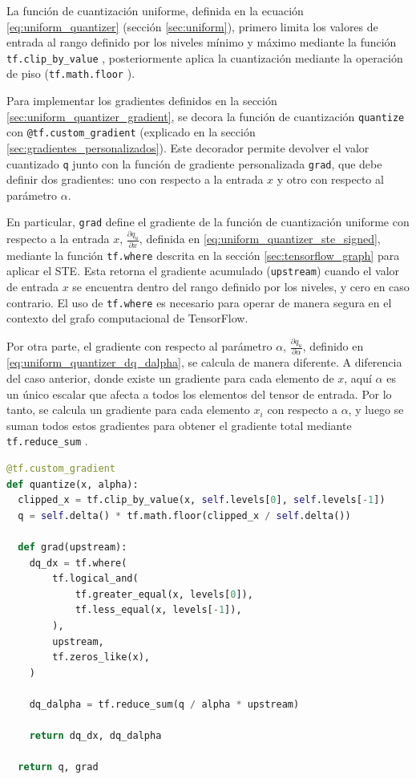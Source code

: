 La función de cuantización uniforme, definida en la ecuación \eqref{eq:uniform_quantizer} (sección \ref{sec:uniform}), primero limita los valores de entrada al rango definido por los niveles mínimo y máximo mediante la función \texttt{tf.clip\_by\_value} \cite{tensorflow_clip_by_value}, posteriormente aplica la cuantización mediante la operación de piso (\texttt{tf.math.floor} \cite{tensorflow_math_floor}).

Para implementar los gradientes definidos en la sección \ref{sec:uniform_quantizer_gradient}, se decora la función de cuantización \texttt{quantize} con \texttt{@tf.custom\_gradient} (explicado en la sección \ref{sec:gradientes_personalizados}). Este decorador permite devolver el valor cuantizado \texttt{q} junto con la función de gradiente personalizada \texttt{grad}, que debe definir dos gradientes: uno con respecto a la entrada $x$ y otro con respecto al parámetro $\alpha$.

En particular, \texttt{grad} define el gradiente de la función de cuantización uniforme con respecto a la entrada $x$, $\frac{\partial q_{u}}{\partial x}$, definida en \eqref{eq:uniform_quantizer_ste_signed}, mediante la función \texttt{tf.where} \cite{tensorflow_where} descrita en la sección \ref{sec:tensorflow_graph} para aplicar el STE. Esta retorna el gradiente acumulado (\texttt{upstream}) cuando el valor de entrada $x$ se encuentra dentro del rango definido por los niveles, y cero en caso contrario. El uso de \texttt{tf.where} es necesario para operar de manera segura en el contexto del grafo computacional de TensorFlow.

Por otra parte, el gradiente con respecto al parámetro $\alpha$, $\frac{\partial q_{u}}{\partial \alpha}$, definido en \eqref{eq:uniform_quantizer_dq_dalpha}, se calcula de manera diferente. A diferencia del caso anterior, donde existe un gradiente para cada elemento de $x$, aquí $\alpha$ es un único escalar que afecta a todos los elementos del tensor de entrada. Por lo tanto, se calcula un gradiente para cada elemento $x_i$ con respecto a $\alpha$, y luego se suman todos estos gradientes para obtener el gradiente total mediante \texttt{tf.reduce\_sum} \cite{tensorflow_reduce_sum}.

\newpage
\begin{lstlisting}[language=Python,label=code:uniform_quantizer_full,caption=Implementación del cuantizador uniforme con gradientes personalizados.]
@tf.custom_gradient
def quantize(x, alpha):
  clipped_x = tf.clip_by_value(x, self.levels[0], self.levels[-1])
  q = self.delta() * tf.math.floor(clipped_x / self.delta())

  def grad(upstream):
    dq_dx = tf.where(
        tf.logical_and(
            tf.greater_equal(x, levels[0]),
            tf.less_equal(x, levels[-1]),
        ),
        upstream,
        tf.zeros_like(x),
    )

    dq_dalpha = tf.reduce_sum(q / alpha * upstream)

    return dq_dx, dq_dalpha

  return q, grad
\end{lstlisting}

